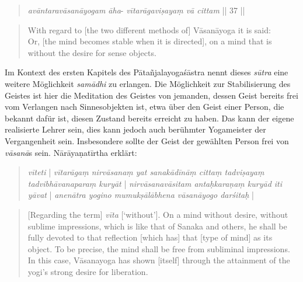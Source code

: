 \begin{quote}
\textit{avāntaravāsanāyogam āha}-
\textit{vītarāgaviṣayaṃ vā cittam} || 37 ||
\end{quote}
\begin{quote}
With regard to [the two different methods of] Vāsanāyoga it is said: \\
Or, [the mind becomes stable when it is directed], on a mind that is without the desire for sense objects. 
\end{quote}

Im Kontext des ersten Kapitels des Pātañjalayogaśāstra nennt dieses \textit{sūtra} eine weitere Möglichkeit \textit{samādhi} zu erlangen. Die Möglichkeit zur Stabilisierung des Geistes ist hier die Meditation des Geistes von jemanden, dessen Geist bereits frei vom Verlangen nach Sinnesobjekten ist, etwa über den Geist einer Person, die bekannt dafür ist, diesen Zustand bereits erreicht zu haben. Das kann der eigene realisierte Lehrer sein, dies kann jedoch auch berühmter Yogameister der Vergangenheit sein. Insbesondere sollte der Geist der gewählten Person frei von \textit{vāsanā}s sein. Nārāyaṇatīrtha erklärt:

\begin{quote}
  \textit{vīteti} | \textit{vītarāgaṃ nirvāsanaṃ yat sanakādīnāṃ cittaṃ tadviṣayaṃ tadvibhāvanaparaṃ kuryāt} | \textit{nirvāsanavāsitam antaḥkaraṇaṃ kuryād iti yāvat} | \textit{anenātra yogino mumukṣālābhena vāsanāyogo darśitaḥ} |
\end{quote}
\begin{quote}
[Regarding the term] \textit{vīta} [`without']. On a mind without desire, without sublime impressions, which is like that of Sanaka and others, he shall be fully devoted to that reflection [which has] that [type of mind] as its object. To be precise, the mind shall be free from subliminal impressions. In this case, Vāsanayoga has shown [itself] through the attainment of the yogi's strong desire for liberation. 
\end{quote}

